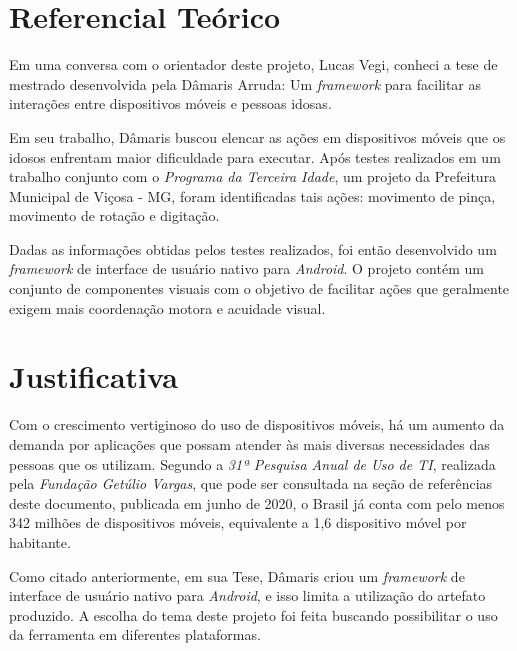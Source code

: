 \documentclass[
	12pt,				    %
	openright,			    %
	oneside,			    %
	a4paper,			    %
    sumario=tradicional,    %
	english,			    %
	brazil,				    %
	]{abntex2}              %
\begin{document}
		\par

\chapter{Referencial Teórico}\label{sec:referencialTeorico}		

		Em uma conversa com o orientador deste projeto, Lucas Vegi, conheci a tese de mestrado desenvolvida pela Dâmaris Arruda: Um \textit{framework} para facilitar as interações entre dispositivos móveis e pessoas idosas.

\par

		Em seu trabalho, Dâmaris buscou elencar as ações em dispositivos móveis que os idosos enfrentam maior dificuldade para executar. Após testes realizados em um trabalho conjunto com o \emph{Programa da Terceira Idade}, um projeto da Prefeitura Municipal de Viçosa - MG, foram identificadas tais ações: movimento de pinça, movimento de rotação e digitação.

Dadas as informações obtidas pelos testes realizados, foi então desenvolvido um \textit{framework} de interface de usuário nativo para \textit{Android}. O projeto contém um conjunto de componentes visuais com o objetivo de facilitar ações que geralmente exigem mais coordenação motora e acuidade visual.

\par

\chapter{Justificativa}\label{sec:justificativa}

Com o crescimento vertiginoso do uso de dispositivos móveis, há um aumento da demanda por aplicações que possam atender às mais diversas necessidades das pessoas que os utilizam. Segundo a \emph{31ª Pesquisa Anual de Uso de TI}, realizada pela \emph{Fundação Getúlio Vargas}, que pode ser consultada na seção de referências deste documento, publicada em junho de 2020, o Brasil já conta com pelo menos 342 milhões de dispositivos móveis, equivalente a 1,6 dispositivo móvel por habitante.

\par

	Como citado anteriormente, em sua Tese, Dâmaris criou um \textit{framework} de interface de usuário nativo para \textit{Android}, e isso limita a utilização do artefato produzido. A escolha do tema deste projeto foi feita buscando possibilitar o uso da ferramenta em diferentes plataformas.
\end{document}
